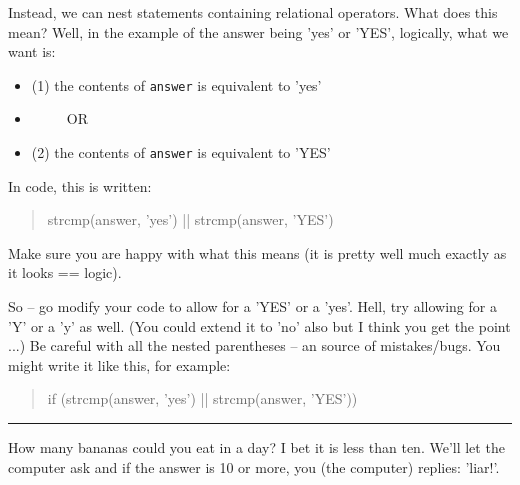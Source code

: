 \documentclass{tufte-book} %
\newenvironment{docspec}{\begin{quotation}\ttfamily\parskip0pt\parindent0pt\ignorespaces}{\end{quotation}}
\begin{document}
Instead, we can nest statements containing relational operators. What does this mean? Well, in the example of the answer being 'yes' or 'YES', logically, what we want is:

\begin{itemize}[noitemsep]
\setlength{\itemindent}{.2in}
\item[] (1) the contents of \texttt{answer} is equivalent to 'yes'
\item[] \ \ \ \ \ OR
\item[] (2) the contents of \texttt{answer} is equivalent to 'YES'
\end{itemize}
In code, this is written:
\begin{docspec}
strcmp(answer, 'yes') || strcmp(answer, 'YES')
\end{docspec}

Make sure you are happy with what this means (it is pretty well much exactly as it looks == logic).

So -- go modify your code to allow for a 'YES' or a 'yes'. Hell, try allowing for  a 'Y' or a 'y' as well. (You could extend it to 'no' also but I think you get the point ...) Be careful with all the nested parentheses -- an source of mistakes/bugs. You might write it like this, for example: 

\begin{docspec}
if (strcmp(answer, 'yes') || strcmp(answer, 'YES'))
\end{docspec}

\vspace{1mm}
\noindent\rule{4cm}{0.5pt}


How many bananas could you eat in a day? I bet it is less than ten. We'll let the computer ask and if the answer is 10 or more, you (the computer) replies: 'liar!'.
\end{document}
